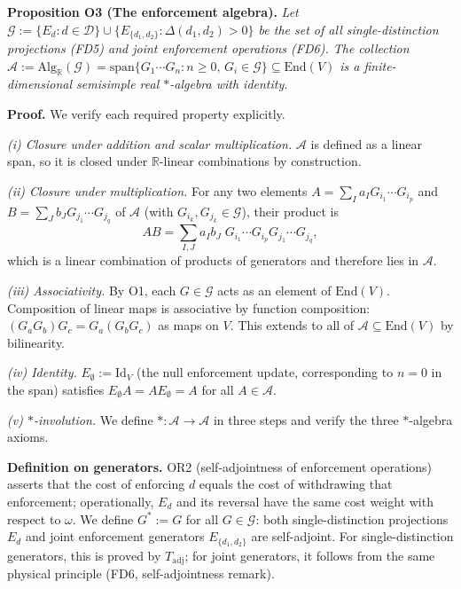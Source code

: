 \documentclass[11pt]{article}
\theoremstyle{remark}
\begin{document}
\smallskip\noindent\textbf{Proposition O3 (The enforcement algebra).}
\emph{Let $\mathcal{G} := \{E_d : d \in \mathcal{D}\} \cup \{E_{\{d_1,d_2\}} : \Delta(d_1,d_2) > 0\}$ be the set of all single-distinction projections (FD5) and joint enforcement operations (FD6).  The collection
$\mathcal{A} := \mathrm{Alg}_\mathbb{R}(\mathcal{G})
= \mathrm{span}\{G_1 \cdots G_n : n \ge 0,\, G_i \in \mathcal{G}\}
\subseteq \mathrm{End}(V)$
is a finite-dimensional semisimple real $*$-algebra with identity.}

\smallskip\noindent\textbf{Proof.}
We verify each required property explicitly.

\textit{(i) Closure under addition and scalar multiplication.}  $\mathcal{A}$ is defined as a linear span, so it is closed under $\mathbb{R}$-linear combinations by construction.

\textit{(ii) Closure under multiplication.}  For any two elements $A = \sum_I a_I G_{i_1}\cdots G_{i_p}$ and $B = \sum_J b_J G_{j_1}\cdots G_{j_q}$ of $\mathcal{A}$ (with $G_{i_k}, G_{j_k} \in \mathcal{G}$), their product is
\[
AB = \sum_{I,J} a_I b_J \; G_{i_1}\cdots G_{i_p} G_{j_1}\cdots G_{j_q},
\]
which is a linear combination of products of generators and therefore lies in $\mathcal{A}$.

\textit{(iii) Associativity.}  By O1, each $G \in \mathcal{G}$ acts as an element of $\mathrm{End}(V)$.  Composition of linear maps is associative by function composition: $(G_a G_b) G_c = G_a (G_b G_c)$ as maps on $V$.  This extends to all of $\mathcal{A} \subseteq \mathrm{End}(V)$ by bilinearity.

\textit{(iv) Identity.}  $E_\emptyset := \mathrm{Id}_V$ (the null enforcement update, corresponding to $n=0$ in the span) satisfies $E_\emptyset A = A E_\emptyset = A$ for all $A \in \mathcal{A}$.

\textit{(v) $*$-involution.}  We define $*: \mathcal{A} \to \mathcal{A}$ in three steps and verify the three $*$-algebra axioms.

\textbf{Definition on generators.}  OR2 (self-adjointness of enforcement operations) asserts that the cost of enforcing $d$ equals the cost of withdrawing that enforcement; operationally, $E_d$ and its reversal have the same cost weight with respect to $\omega$.  We define $G^* := G$ for all $G \in \mathcal{G}$: both single-distinction projections $E_d$ and joint enforcement generators $E_{\{d_1,d_2\}}$ are self-adjoint.  For single-distinction generators, this is proved by $T_{\mathrm{adj}}$; for joint generators, it follows from the same physical principle (FD6, self-adjointness remark).
\end{document}
